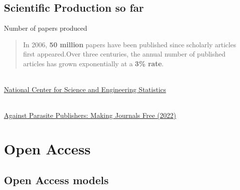 \documentclass[10pt,compress,serif,aspectratio=169]{beamer}
\begin{document}


\subsection{Scientific Production so far}
   \begin{frame}[t]{Number of papers produced}

 \begin{quote}
 In 2006, \textbf{50 million} papers have been published since scholarly articles first appeared.\newline Over three centuries, the annual number of published articles has grown exponentially at a \textbf{3\% rate}.
 \end{quote}
 \pause
\begin{minipage}{.6\textwidth}
  \\
  {\tiny \href{https://ncses.nsf.gov/pubs/nsb20214/publication-output-by-country-region-or-economy-and-scientific-field}{National Center for Science and Engineering Statistics}}
\end{minipage}
\pause
 \begin{minipage}{.39\textwidth}
   \\
   {\tiny    \href{https://doi.org/10.5281/zenodo.7212922}{Against Parasite Publishers: Making Journals Free (2022)}}
\end{minipage}
\end{frame}



\section{Open Access}
\subsection{Open Access models}
\end{document}
